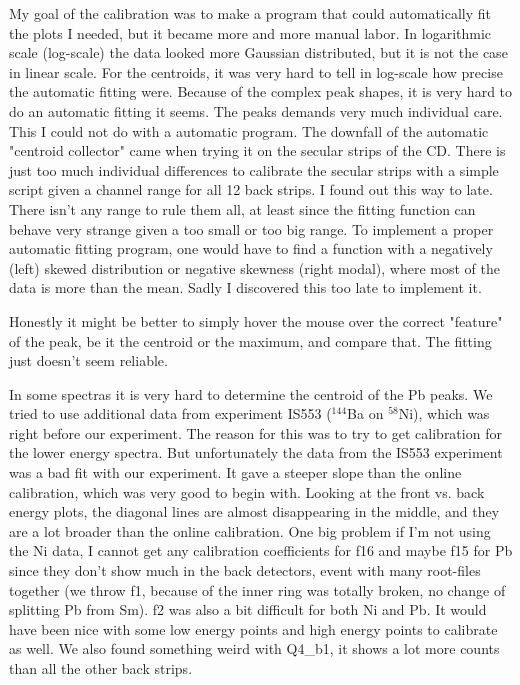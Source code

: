 \documentclass[twoside,english]{uiofysmaster/uiofysmaster}
\begin{document}
My goal of the calibration was to make a program that could automatically fit the plots I needed, but it became more and more manual labor. 
In logarithmic scale (log-scale) the data looked more Gaussian distributed, but it is not the case in linear scale. 
For the centroids, it was very hard to tell in log-scale how precise the automatic fitting were. 
Because of the complex peak shapes, it is very hard to do an automatic fitting it seems. 
The peaks demands very much individual care. 
This I could not do with a automatic program. 
The downfall of the automatic "centroid collector" came when trying it on the secular strips of the CD. 
There is just too much individual differences to calibrate the secular strips with a simple script given a channel range for all 12 back strips. 
I found out this way to late. 
There isn't any range to rule them all, at least since the fitting function can behave very strange given a too small or too big range.
To implement a proper automatic fitting program, one would have to find a function with a negatively (left) skewed distribution or negative skewness (right modal), where most of the data is more than the mean. Sadly I discovered this too late to implement it. 

Honestly it might be better to simply hover the mouse over the correct "feature" of the peak, be it the centroid or the maximum, and compare that. 
The fitting just doesn't seem reliable.

In some spectras it is very hard to determine the centroid of the Pb peaks. 
We tried to use additional data from experiment IS553 ($^{144}$Ba on $^{58}$Ni), which was right before our experiment. 
The reason for this was to try to get calibration for the lower energy spectra. 
But unfortunately the data from the IS553 experiment was a bad fit with our experiment. 
It gave a steeper slope than the online calibration, which was very good to begin with. 
Looking at the front vs. back energy plots, the diagonal lines are almost disappearing in the middle, and they are a lot broader than the online calibration. 
One big problem if I'm not using the Ni data, I cannot get any calibration coefficients for f16 and maybe f15 for Pb since they don't show much in the back detectors, event with many root-files together (we throw f1, because of the inner ring was totally broken, no change of splitting Pb from Sm). f2 was also a bit difficult for both Ni and Pb. 
It would have been nice with some low energy points and high energy points to calibrate as well. 
We also found something weird with Q4\_b1, it shows a lot more counts than all the other back strips. 
\end{document}
